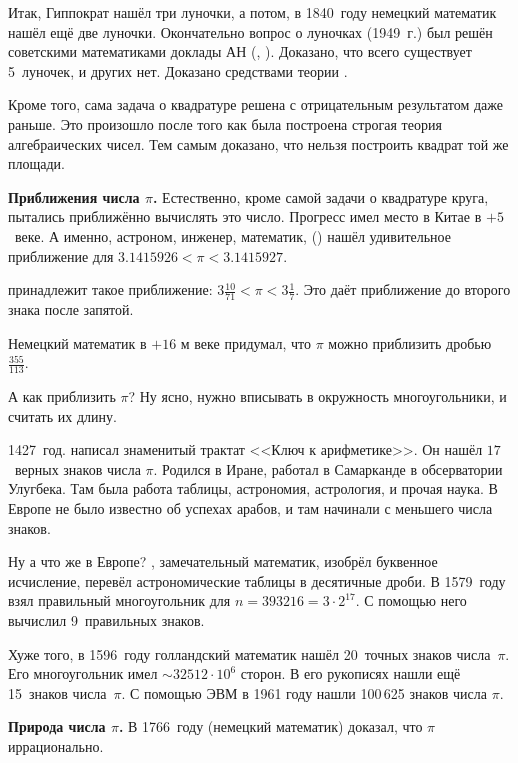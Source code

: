 \documentclass[a4paper,oneside,fleqn,10pt]{article}
\begin{document}
Итак, Гиппократ нашёл три луночки, а потом, в 1840~году немецкий
математик  нашёл ещё две луночки.  Окончательно вопрос о
луночках (1949~г.) был решён советскими математиками доклады АН
(, ).  Доказано, что всего существует
5~луночек, и других нет.  Доказано средствами теории .

Кроме того, сама задача о квадратуре решена с отрицательным
результатом даже раньше.  Это произошло после того как была построена
строгая теория алгебраических чисел. Тем самым доказано, что нельзя
построить квадрат той же площади.

\textbf{Приближения числа $\pi$.}  Естественно, кроме самой задачи о
квадратуре круга, пытались приближённо вычислять это число. Прогресс
имел место в Китае в $+5$~веке. А именно, астроном, инженер,
математик,  () нашёл удивительное
приближение для $3.1415926 < \pi < 3.1415927$.

 принадлежит такое приближение:
$3\frac{10}{71} < \pi < 3 \frac{1}{7}$.  Это даёт приближение до
второго знака после запятой.

Немецкий математик  в $+16$ м веке придумал, что $\pi$
можно приблизить дробью $\frac{355}{113}$.

А как приблизить $\pi$? Ну ясно, нужно вписывать в окружность
многоугольники, и считать их длину.

1427~год.  написал знаменитый трактат <<Ключ к
арифметике>>. Он нашёл $17$~верных знаков числа $\pi$.  Родился в
Иране, работал в Самарканде в обсерватории Улугбека. Там была работа
таблицы, астрономия, астрология, и прочая наука. В Европе не было
известно об успехах арабов, и там начинали с меньшего числа знаков.

Ну а что же в Европе? , замечательный
математик, изобрёл буквенное исчисление, перевёл астрономические
таблицы в десятичные дроби. В 1579~году взял правильный многоугольник
для $n = 393216 = 3\cdot 2^{17}$.  С помощью него вычислил
9~правильных знаков.

Хуже того, в 1596~году голландский математик  нашёл 20~точных знаков числа~$\pi$.
Его многоугольник имел $\sim32512\cdot 10^6$ сторон. В его рукописях
нашли ещё 15~знаков числа~$\pi$.  С помощью ЭВМ в 1961 году нашли
100\,625 знаков числа $\pi$.

\textbf{Природа числа $\pi$.}  В 1766~году  (немецкий математик) доказал, что $\pi$
иррационально.
\end{document}
